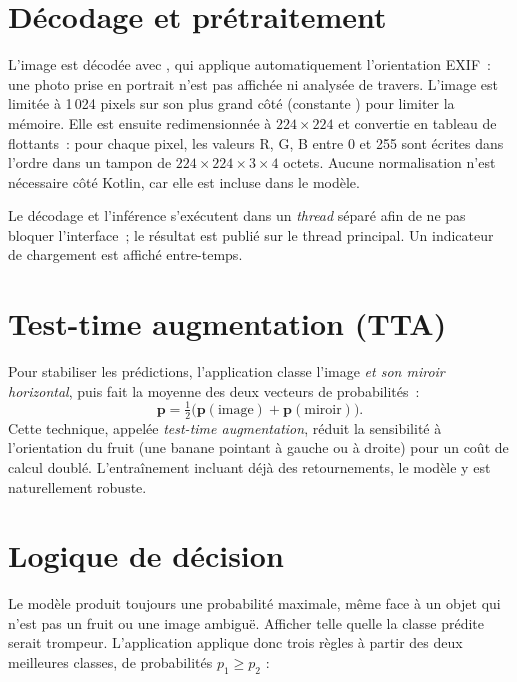 \section{Décodage et prétraitement}

L’image est décodée avec , qui applique automatiquement l’orientation EXIF~: une photo prise en portrait n’est pas affichée ni analysée de travers. L’image est limitée à 1\,024 pixels sur son plus grand côté (constante ) pour limiter la mémoire. Elle est ensuite redimensionnée à $224\times224$ et convertie en tableau de flottants~: pour chaque pixel, les valeurs R, G, B entre 0 et 255 sont écrites dans l’ordre dans un tampon de $224\times224\times3\times4$ octets. Aucune normalisation n’est nécessaire côté Kotlin, car elle est incluse dans le modèle.

Le décodage et l’inférence s’exécutent dans un \emph{thread} séparé afin de ne pas bloquer l’interface~; le résultat est publié sur le thread principal. Un indicateur de chargement est affiché entre-temps.

\section{Test-time augmentation (TTA)}\label{sec:tta}

Pour stabiliser les prédictions, l’application classe l’image \emph{et son miroir horizontal}, puis fait la moyenne des deux vecteurs de probabilités~:
\begin{equation}
  \mathbf{p} = \tfrac{1}{2}\bigl(\mathbf{p}(\text{image}) + \mathbf{p}(\text{miroir})\bigr).
\end{equation}
Cette technique, appelée \emph{test-time augmentation}, réduit la sensibilité à l’orientation du fruit (une banane pointant à gauche ou à droite) pour un coût de calcul doublé. L’entraînement incluant déjà des retournements, le modèle y est naturellement robuste.

\section{Logique de décision}

Le modèle produit toujours une probabilité maximale, même face à un objet qui n’est pas un fruit ou une image ambiguë. Afficher telle quelle la classe prédite serait trompeur. L’application applique donc trois règles à partir des deux meilleures classes, de probabilités $p_1\ge p_2$ :

